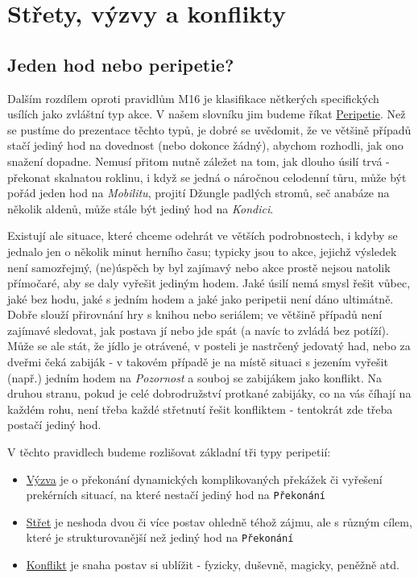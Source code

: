 \chapter{Střety, výzvy a konflikty}
\label{chap:jdesenavec}

\section{Jeden hod nebo peripetie?}
\label{sec:hod/peripetie}

Dalším rozdílem oproti pravidlům M16 je klasifikace nětkerých specifických usílích jako zvláštní typ akce. V našem slovníku jim budeme říkat \underline{Peripetie}. Než se pustíme do prezentace těchto typů, je dobré se uvědomit, že ve většině případů stačí jediný hod na dovednost (nebo dokonce žádný), abychom rozhodli, jak ono snažení dopadne. Nemusí přitom nutně záležet na tom, jak dlouho úsilí trvá - překonat skalnatou roklinu, i když se jedná o náročnou celodenní tůru, může být pořád jeden hod na \textit{Mobilitu}, projití Džungle padlých stromů, seč anabáze na několik aldenů, může stále být jediný hod na \textit{Kondici}.

Existují ale situace, které chceme odehrát ve větších podrobnostech, i kdyby se jednalo jen o několik minut herního času; typicky jsou to akce, jejichž výsledek není samozřejmý, (ne)úspěch by byl zajímavý nebo akce prostě nejsou natolik přímočaré, aby se daly vyřešit jediným hodem. Jaké úsilí nemá smysl řešit vůbec, jaké bez hodu, jaké s jedním hodem a jaké jako peripetii není dáno ultimátně. Dobře slouží přirovnání hry s knihou nebo seriálem; ve většině případů není zajímavé sledovat, jak postava jí nebo jde spát (a navíc to zvládá bez potíží). Může se ale stát, že jídlo je otrávené, v posteli je nastrčený jedovatý had, nebo za dveřmi čeká zabiják - v takovém případě je na místě situaci s jezením vyřešit (např.) jedním hodem na \textit{Pozornost} a souboj se zabijákem jako konflikt. Na druhou stranu, pokud je celé dobrodružství protkané zabijáky, co na vás číhají na každém rohu, není třeba každé střetnutí řešit konfliktem - tentokrát zde třeba postačí jediný hod.

V těchto pravidlech budeme rozlišovat základní tři typy peripetií:

\begin{itemize}
\item \underline{Výzva} je o překonání dynamických komplikovaných překážek či vyřešení prekérních situací, na které nestačí jediný hod na \texttt{Překonání}
\item \underline{Střet} je neshoda dvou či více postav ohledně téhož zájmu, ale s různým cílem, které je strukturovanější než jediný hod na \texttt{Překonání}
\item \underline{Konflikt} je snaha postav si ublížit - fyzicky, duševně, magicky, peněžně atd.
\end{itemize}

